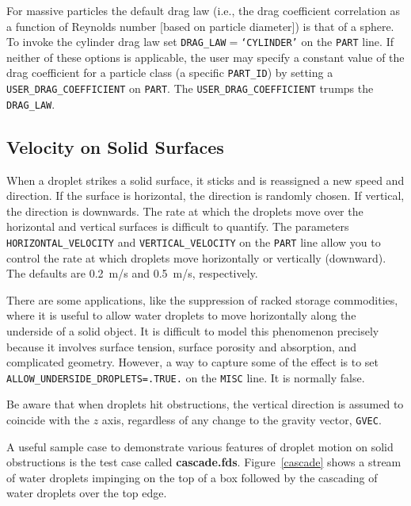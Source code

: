 \documentclass[11pt]{book}
\newcommand{\ct}{\tt\small}
\begin{document}
For massive particles the default drag law (i.e., the drag coefficient correlation as a function of Reynolds number [based on particle diameter]) is that of a sphere.
To invoke the cylinder drag law set {\ct DRAG\_LAW$=$`CYLINDER'} on the {\ct PART} line.  If neither of these options is applicable,
the user may specify a constant value of the drag coefficient for a particle class (a specific {\ct PART\_ID}) by setting a {\ct USER\_DRAG\_COEFFICIENT} on {\ct PART}.
The {\ct USER\_DRAG\_COEFFICIENT} trumps the {\ct DRAG\_LAW}.

\subsection{Velocity on Solid Surfaces}
\label{info:surface_droplets}

When a droplet strikes a solid surface, it sticks and is reassigned a new speed and direction. If the surface is
horizontal, the direction is randomly chosen. If vertical, the direction is downwards.
The rate at which the droplets move over the horizontal and vertical surfaces is difficult to
quantify. The parameters {\ct HORIZONTAL\_VELOCITY} and {\ct VERTICAL\_VELOCITY} on the {\ct PART} line
allow you to control the rate at which droplets move horizontally or vertically (downward). The defaults are
0.2~m/s and 0.5~m/s, respectively.

There are some applications, like the suppression of racked storage commodities, where it is useful to allow water droplets to move horizontally
along the underside of a solid object. It is difficult to model this phenomenon precisely because it involves surface tension, surface porosity and
absorption, and complicated geometry. However, a way to capture some of the effect is to set {\ct ALLOW\_UNDERSIDE\_DROPLETS=.TRUE.} on the
{\ct MISC} line. It is normally false.

\begin{warning}
Be aware that when droplets hit obstructions, the vertical direction is assumed to coincide with the $z$ axis, regardless of any change to the gravity vector, {\ct GVEC}.
\end{warning}

\noindent
A useful sample case to demonstrate various features of droplet motion on solid obstructions is the test case called {\bf cascade.fds}. Figure~\ref{cascade} shows a stream
of water droplets impinging on the top of a box followed by the cascading of water droplets over the top edge.
\end{document}
